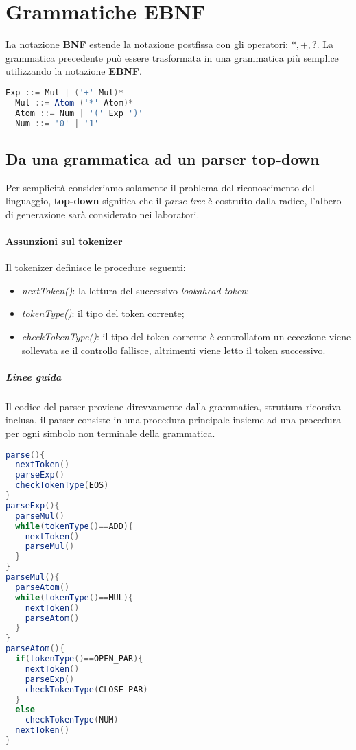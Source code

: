 \section{Grammatiche EBNF}
La notazione \textbf{BNF} estende la notazione postfissa con gli operatori:
$*,+,?$.
La grammatica precedente può essere trasformata in una grammatica più semplice
utilizzando la notazione \textbf{EBNF}.

\begin{lstlisting}[language=Java, caption={Soluzione completa utilizando la gammatica ENBNF}]
  Exp ::= Mul | ('+' Mul)*
  Mul ::= Atom ('*' Atom)*
  Atom ::= Num | '(' Exp ')'
  Num ::= '0' | '1'
\end{lstlisting}

\subsection{Da una grammatica ad un parser top-down}
Per semplicità consideriamo solamente il problema del riconoscimento del
linguaggio, \textbf{top-down} significa che il \emph{parse tree} è costruito
dalla radice, l'albero di generazione sarà considerato nei laboratori.

\paragraph{Assunzioni sul tokenizer}
Il tokenizer definisce le procedure seguenti:
\begin{itemize}
  \item \textit{nextToken()}: la lettura del successivo \emph{lookahead token};
  \item \textit{tokenType()}: il tipo del token corrente;
  \item \textit{checkTokenType()}: il tipo del token corrente è controllatom
    un eccezione viene sollevata se il controllo fallisce, altrimenti viene
    letto il token successivo.
\end{itemize}

\subparagraph{Linee guida}
Il codice del parser proviene direvvamente dalla grammatica, struttura
ricorsiva inclusa, il parser consiste in una procedura principale insieme ad
una procedura per ogni simbolo non terminale della grammatica.

\begin{lstlisting}[language=Java, caption={Pseudocodice detivara dalla grammatica EBNF precedente}]
parse(){
  nextToken()
  parseExp()
  checkTokenType(EOS)
}
parseExp(){
  parseMul()
  while(tokenType()==ADD){
    nextToken()
    parseMul()
  }
}
parseMul(){
  parseAtom()
  while(tokenType()==MUL){
    nextToken()
    parseAtom()
  }
}
parseAtom(){
  if(tokenType()==OPEN_PAR){
    nextToken()
    parseExp()
    checkTokenType(CLOSE_PAR)
  }
  else
    checkTokenType(NUM)
  nextToken()
}
\end{lstlisting}

